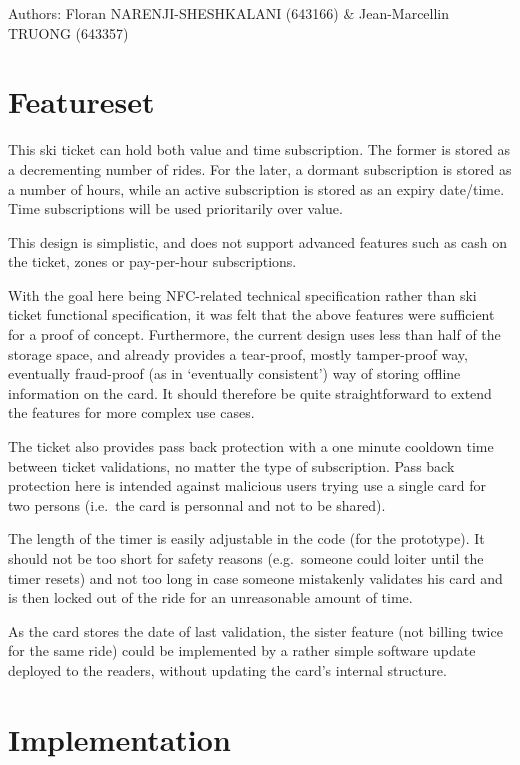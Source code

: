 \documentclass[paper=a4, fontsize=11pt]{scrartcl}
\author{Floran NARENJI-SHESHKALANI \& Jean-Marcellin TRUONG}
\begin{document}
Authors: Floran NARENJI-SHESHKALANI (643166) \& Jean-Marcellin TRUONG (643357)

\section{Featureset}

This ski ticket can hold both value and time subscription.
The former is stored as a decrementing number of rides.
For the later, a dormant subscription is stored as a number of hours, while an
active subscription is stored as an expiry date/time.
Time subscriptions will be used prioritarily over value.

This design is simplistic, and does not support advanced features such as cash
on the ticket, zones or pay-per-hour subscriptions.

With the goal here being NFC-related technical specification rather than ski
ticket functional specification, it was felt that the above features were
sufficient for a proof of concept.
Furthermore, the current design uses less than half of the storage space, and
already provides a tear-proof, mostly tamper-proof way, eventually fraud-proof
(as in `eventually consistent') way of storing offline information on the card.
It should therefore be quite straightforward to extend the features for more
complex use cases.

The ticket also provides pass back protection with a one minute cooldown time
between ticket validations, no matter the type of subscription.
Pass back protection here is intended against malicious users trying
use a single card for two persons (i.e.\ the card is personnal and not to be
shared).

The length of the timer is easily adjustable in the code (for the prototype).
It should not be too short for safety reasons (e.g.\ someone could loiter until
the timer resets) and not too long in case someone mistakenly validates his card
and is then locked out of the ride for an unreasonable amount of time.

As the card stores the date of last validation, the sister feature (not
billing twice for the same ride) could be implemented by a rather simple
software update deployed to the readers, without updating the
card's internal structure.

\section{Implementation}
\end{document}

